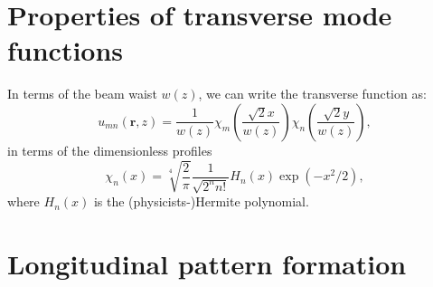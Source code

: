 \documentclass[pra,twocolumn,superscriptaddress]{revtex4-1}
\newcommand{\vect}[1]{\mathbf{#1}}
\newcommand{\transverse}{u}
\begin{document}
\section{Properties of transverse mode functions}
\label{sec:prop-transv-mode}

In terms of the beam waist $w(z)$, we can write the transverse
function as:
\begin{displaymath}
  \transverse_{mn}(\vect r,z) = \frac{1}{{w(z)}}
  \chi_m\left( \frac{\sqrt{2}x}{w(z)}\right)
  \chi_n\left( \frac{\sqrt{2}y}{w(z)}\right),
\end{displaymath}
in terms of the dimensionless profiles
\begin{displaymath}
  \chi_{n}(x)=\sqrt[4]{\frac{2}{\pi}} \frac{1}{\sqrt{2^n n!}}
    H_n(x) \exp(-x^2/2),
\end{displaymath}
where $H_n(x)$ is the (physicists-)Hermite polynomial.


\section{Longitudinal pattern formation}
\label{sec:long-patt-form}
\end{document}
